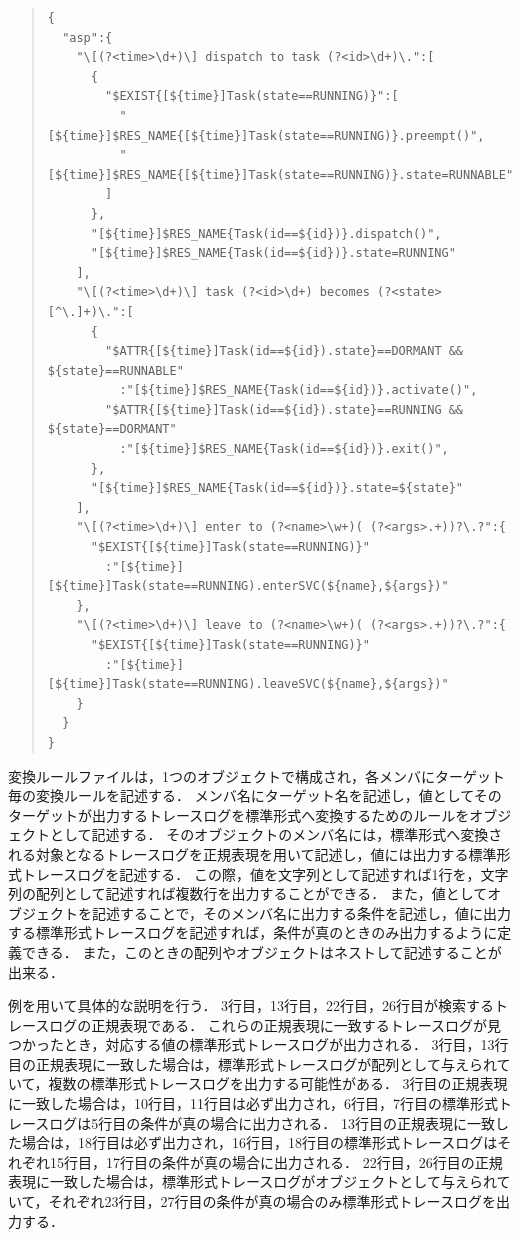 \vspace{1zw}
{\scriptsize
\begin{quote}
\bkcounttrue
\begin{breakbox}
\setlength{\baselineskip}{0.8\normalbaselineskip}
\begin{verbatim}
{
  "asp":{
    "\[(?<time>\d+)\] dispatch to task (?<id>\d+)\.":[
      {
        "$EXIST{[${time}]Task(state==RUNNING)}":[
          "[${time}]$RES_NAME{[${time}]Task(state==RUNNING)}.preempt()",
          "[${time}]$RES_NAME{[${time}]Task(state==RUNNING)}.state=RUNNABLE"
        ]
      },
      "[${time}]$RES_NAME{Task(id==${id})}.dispatch()",
      "[${time}]$RES_NAME{Task(id==${id})}.state=RUNNING"
    ],
    "\[(?<time>\d+)\] task (?<id>\d+) becomes (?<state>[^\.]+)\.":[
      {
        "$ATTR{[${time}]Task(id==${id}).state}==DORMANT && ${state}==RUNNABLE"
          :"[${time}]$RES_NAME{Task(id==${id})}.activate()",
        "$ATTR{[${time}]Task(id==${id}).state}==RUNNING && ${state}==DORMANT"
          :"[${time}]$RES_NAME{Task(id==${id})}.exit()",
      },
      "[${time}]$RES_NAME{Task(id==${id})}.state=${state}"
    ],
    "\[(?<time>\d+)\] enter to (?<name>\w+)( (?<args>.+))?\.?":{
      "$EXIST{[${time}]Task(state==RUNNING)}"
        :"[${time}][${time}]Task(state==RUNNING).enterSVC(${name},${args})"
    },
    "\[(?<time>\d+)\] leave to (?<name>\w+)( (?<args>.+))?\.?":{
      "$EXIST{[${time}]Task(state==RUNNING)}"
        :"[${time}][${time}]Task(state==RUNNING).leaveSVC(${name},${args})"
    }
  }
}
\end{verbatim}
\end{breakbox}
\end{quote}
}
\vspace{1zw}

変換ルールファイルは，1つのオブジェクトで構成され，各メンバにターゲット毎の変換ルールを記述する．
メンバ名にターゲット名を記述し，値としてそのターゲットが出力するトレースログを標準形式へ変換するためのルールをオブジェクトとして記述する．
そのオブジェクトのメンバ名には，標準形式へ変換される対象となるトレースログを正規表現を用いて記述し，値には出力する標準形式トレースログを記述する．
この際，値を文字列として記述すれば1行を，文字列の配列として記述すれば複数行を出力することができる．
また，値としてオブジェクトを記述することで，そのメンバ名に出力する条件を記述し，値に出力する標準形式トレースログを記述すれば，条件が真のときのみ出力するように定義できる．
また，このときの配列やオブジェクトはネストして記述することが出来る．

例を用いて具体的な説明を行う．
3行目，13行目，22行目，26行目が検索するトレースログの正規表現である．
これらの正規表現に一致するトレースログが見つかったとき，対応する値の標準形式トレースログが出力される．
3行目，13行目の正規表現に一致した場合は，標準形式トレースログが配列として与えられていて，複数の標準形式トレースログを出力する可能性がある．
3行目の正規表現に一致した場合は，10行目，11行目は必ず出力され，6行目，7行目の標準形式トレースログは5行目の条件が真の場合に出力される．
13行目の正規表現に一致した場合は，18行目は必ず出力され，16行目，18行目の標準形式トレースログはそれぞれ15行目，17行目の条件が真の場合に出力される．
22行目，26行目の正規表現に一致した場合は，標準形式トレースログがオブジェクトとして与えられていて，それぞれ23行目，27行目の条件が真の場合のみ標準形式トレースログを出力する．

